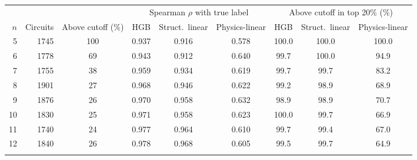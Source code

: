 \begin{tabular}{rrccccccc}
\toprule
 & & & \multicolumn{3}{c}{Spearman $\rho$ with true label} & \multicolumn{3}{c}{Above cutoff in top 20\% (\%)} \\
\cmidrule(lr){4-6}\cmidrule(lr){7-9}
$n$ & Circuits & Above cutoff (\%) & HGB & Struct.~linear & Physics-linear & HGB & Struct.~linear & Physics-linear \\
\midrule
5 & 1745 & 100 & 0.937 & 0.916 & 0.578 & 100.0 & 100.0 & 100.0 \\
6 & 1778 & 69 & 0.943 & 0.912 & 0.640 & 99.7 & 100.0 & 94.9 \\
7 & 1755 & 38 & 0.959 & 0.934 & 0.619 & 99.7 & 99.7 & 83.2 \\
8 & 1901 & 27 & 0.968 & 0.946 & 0.622 & 99.2 & 98.9 & 68.9 \\
9 & 1876 & 26 & 0.970 & 0.958 & 0.632 & 98.9 & 98.9 & 70.7 \\
10 & 1830 & 25 & 0.971 & 0.958 & 0.623 & 100.0 & 99.7 & 66.9 \\
11 & 1740 & 24 & 0.977 & 0.964 & 0.610 & 99.7 & 99.4 & 67.0 \\
12 & 1840 & 26 & 0.978 & 0.968 & 0.605 & 99.5 & 99.7 & 64.9 \\
\botrule
\end{tabular}
